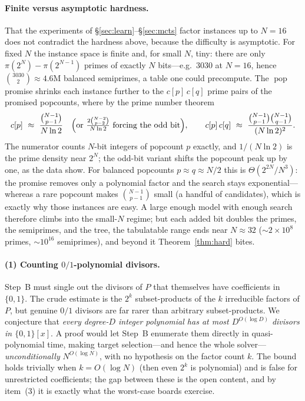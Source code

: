 \documentclass[11pt]{article}
\theoremstyle{definition}
\theoremstyle{plain}
\theoremstyle{remark}
\newcommand{\popc}{\operatorname{pop}}
\begin{document}
\paragraph{Finite versus asymptotic hardness.}
That the experiments of \S\ref{sec:learn}--\S\ref{sec:mcts} factor instances up to $N=16$ does
not contradict the hardness above, because the difficulty is asymptotic. For fixed $N$ the
instance space is finite and, for small $N$, tiny: there are only $\pi(2^{N})-\pi(2^{N-1})$
primes of exactly $N$ bits---e.g.\ $3030$ at $N=16$, hence $\binom{3030}{2}\approx4.6$M
balanced semiprimes, a table one could precompute. The $\popc$ promise shrinks each instance
further to the $c[p]\,c[q]$ prime pairs of the promised popcounts, where by the prime number
theorem
\[
c[p]\ \approx\ \frac{\binom{N-1}{p-1}}{N\ln 2}
\quad\Bigl(\text{or }\tfrac{2\binom{N-2}{p-2}}{N\ln 2}\text{ forcing the odd bit}\Bigr),
\qquad
c[p]\,c[q]\ \approx\ \frac{\binom{N-1}{p-1}\binom{N-1}{q-1}}{(N\ln 2)^2}.
\]
The numerator counts $N$-bit integers of popcount $p$ exactly, and $1/(N\ln 2)$ is the prime
density near $2^{N}$; the odd-bit variant shifts the popcount peak up by one, as the data
show. For balanced popcounts $p\approx q\approx N/2$ this is $\Theta(2^{2N}/N^{3})$: the
promise removes only a polynomial factor and the search stays exponential---whereas a rare
popcount makes $\binom{N-1}{p-1}$ small (a handful of candidates), which is exactly why those
instances are easy. A large enough model with enough search therefore
climbs into the small-$N$ regime; but each added bit doubles the primes, the semiprimes, and
the tree, the tabulatable range ends near $N\approx32$ ($\sim2\times10^{8}$ primes,
$\sim10^{16}$ semiprimes), and beyond it Theorem~\ref{thm:hard} bites.

\paragraph{(1) Counting $0/1$-polynomial divisors.}
Step~B must single out the divisors of $P$ that themselves have coefficients in
$\{0,1\}$. The crude estimate is the $2^{k}$ subset-products of the $k$ irreducible
factors of $P$, but genuine $0/1$ divisors are far rarer than arbitrary subset-products.
We conjecture that \emph{every degree-$D$ integer polynomial has at most $D^{O(\log D)}$
divisors in $\{0,1\}[x]$}. A proof would let Step~B enumerate them directly in
quasi-polynomial time, making target selection---and hence the whole
solver---\emph{unconditionally} $N^{O(\log N)}$, with no hypothesis on the factor count
$k$. The bound holds trivially when $k=O(\log N)$ (then even $2^{k}$ is polynomial) and is
false for unrestricted coefficients; the gap between these is the open content, and by
item~(3) it is exactly what the worst-case boards exercise.
\end{document}

